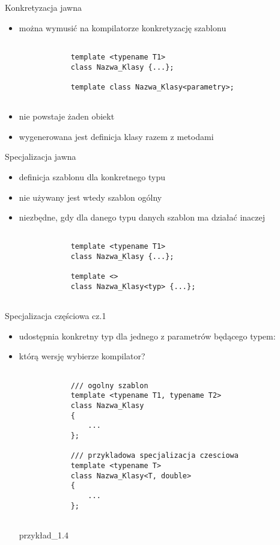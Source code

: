 \documentclass[11pt]{beamer}
\begin{document}
\begin{frame}[fragile]{Konkretyzacja jawna}
	\begin{itemize}
		\item można wymusić na kompilatorze konkretyzację szablonu
		\begin{lstlisting}[frame=single]  % Start your code-block
		
			template <typename T1> 
			class Nazwa_Klasy {...};
		
			template class Nazwa_Klasy<parametry>;
			
		\end{lstlisting}
		\item nie powstaje żaden obiekt
		\item wygenerowana jest definicja klasy razem z metodami
	\end{itemize}

\end{frame}



\begin{frame}[fragile]{Specjalizacja jawna}
	\begin{itemize}
		\item definicja szablonu dla konkretnego typu
		\item nie używany jest wtedy szablon ogólny
		\item niezbędne, gdy dla danego typu danych szablon ma działać inaczej
		\begin{lstlisting}[frame=single]  % Start your code-block
		
			template <typename T1> 
			class Nazwa_Klasy {...};
		
			template <> 
			class Nazwa_Klasy<typ> {...};
			
		\end{lstlisting}
	\end{itemize}

\end{frame}



\begin{frame}[fragile]{Specjalizacja częściowa cz.1}
	\begin{itemize}
		\item udostępnia konkretny typ dla jednego z parametrów będącego typem:
		\item którą wersję wybierze kompilator?
		
		\begin{lstlisting}[frame=single]  % Start your code-block
		
			/// ogolny szablon
			template <typename T1, typename T2>
			class Nazwa_Klasy 
			{
				...
			};
			
			/// przykladowa specjalizacja czesciowa
			template <typename T>
			class Nazwa_Klasy<T, double>
			{
				...
			};
			
		\end{lstlisting}
		\alert{przykład\_1.4}
	\end{itemize}

\end{frame}
\end{document}
